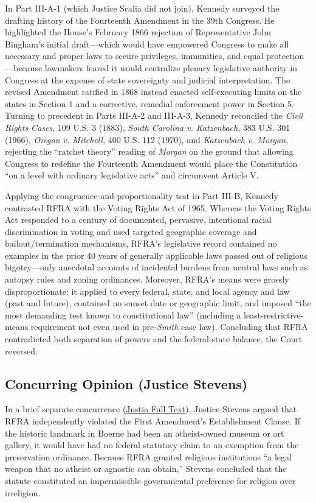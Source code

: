 \documentclass[12pt]{article}
\begin{document}
In Part III-A-1 (which Justice Scalia did not join), Kennedy surveyed the drafting history of the Fourteenth Amendment in the 39th Congress. He highlighted the House's February 1866 rejection of Representative John Bingham's initial draft---which would have empowered Congress to make all necessary and proper laws to secure privileges, immunities, and equal protection---because lawmakers feared it would centralize plenary legislative authority in Congress at the expense of state sovereignty and judicial interpretation. The revised Amendment ratified in 1868 instead enacted self-executing limits on the states in Section 1 and a corrective, remedial enforcement power in Section 5. Turning to precedent in Parts III-A-2 and III-A-3, Kennedy reconciled the \textit{Civil Rights Cases}, 109 U.S. 3 (1883), \textit{South Carolina v. Katzenbach}, 383 U.S. 301 (1966), \textit{Oregon v. Mitchell}, 400 U.S. 112 (1970), and \textit{Katzenbach v. Morgan}, rejecting the ``ratchet theory'' reading of \textit{Morgan} on the ground that allowing Congress to redefine the Fourteenth Amendment would place the Constitution ``on a level with ordinary legislative acts'' and circumvent Article V.

Applying the congruence-and-proportionality test in Part III-B, Kennedy contrasted RFRA with the Voting Rights Act of 1965. Whereas the Voting Rights Act responded to a century of documented, pervasive, intentional racial discrimination in voting and used targeted geographic coverage and bailout/termination mechanisms, RFRA's legislative record contained no examples in the prior 40 years of generally applicable laws passed out of religious bigotry---only anecdotal accounts of incidental burdens from neutral laws such as autopsy rules and zoning ordinances. Moreover, RFRA's means were grossly disproportionate: it applied to every federal, state, and local agency and law (past and future), contained no sunset date or geographic limit, and imposed ``the most demanding test known to constitutional law'' (including a least-restrictive-means requirement not even used in pre-\textit{Smith} case law). Concluding that RFRA contradicted both separation of powers and the federal-state balance, the Court reversed.

\subsection{Concurring Opinion (Justice Stevens)}

In a brief separate concurrence (\href{https://supreme.justia.com/cases/federal/us/521/507/}{Justia Full Text}), Justice Stevens argued that RFRA independently violated the First Amendment's Establishment Clause. If the historic landmark in Boerne had been an atheist-owned museum or art gallery, it would have had no federal statutory claim to an exemption from the preservation ordinance. Because RFRA granted religious institutions ``a legal weapon that no atheist or agnostic can obtain,'' Stevens concluded that the statute constituted an impermissible governmental preference for religion over irreligion.
\end{document}
